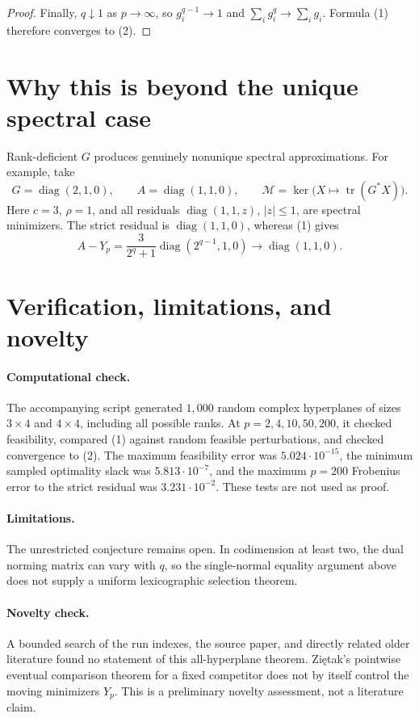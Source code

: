 \documentclass[11pt]{article}
\newcommand{\M}{\mathcal M}
\newcommand{\tr}{\operatorname{tr}}
\newcommand{\diag}{\operatorname{diag}}
\begin{document}
\begin{proof}
Finally, \(q\downarrow1\) as \(p\to\infty\), so
\(g_i^{q-1}\to1\) and \(\sum_i g_i^q\to\sum_i g_i\).  Formula (1)
therefore converges to (2).
\end{proof}

\section{Why this is beyond the unique spectral case}

Rank-deficient \(G\) produces genuinely nonunique spectral
approximations.  For example, take
\[
 G=\diag(2,1,0),\qquad A=\diag(1,1,0),\qquad
 \M=\ker\!\bigl(X\mapsto\tr(G^*X)\bigr).
\]
Here \(c=3\), \(\rho=1\), and all residuals
\(\diag(1,1,z)\), \(|z|\leq1\), are spectral minimizers.  The strict
residual is \(\diag(1,1,0)\), whereas (1) gives
\[
 A-Y_p=\frac{3}{2^q+1}\diag(2^{q-1},1,0)
          \longrightarrow\diag(1,1,0).
\]

\section{Verification, limitations, and novelty}

\paragraph{Computational check.}
The accompanying script generated \(1{,}000\) random complex
hyperplanes of sizes \(3\times4\) and \(4\times4\), including all
possible ranks.  At \(p=2,4,10,50,200\), it checked feasibility,
compared (1) against random feasible perturbations, and checked
convergence to (2).  The maximum feasibility error was
\(5.024\cdot10^{-15}\), the minimum sampled optimality slack was
\(5.813\cdot10^{-7}\), and the maximum \(p=200\) Frobenius error to the
strict residual was \(3.231\cdot10^{-2}\).  These tests are not used as
proof.

\paragraph{Limitations.}
The unrestricted conjecture remains open.  In codimension at least two,
the dual norming matrix can vary with \(q\), so the single-normal
equality argument above does not supply a uniform lexicographic
selection theorem.

\paragraph{Novelty check.}
A bounded search of the run indexes, the source paper, and directly
related older literature found no statement of this all-hyperplane
theorem.  Ziętak's pointwise eventual comparison theorem for a fixed
competitor does not by itself control the moving minimizers \(Y_p\).
This is a preliminary novelty assessment, not a literature claim.
\end{document}

